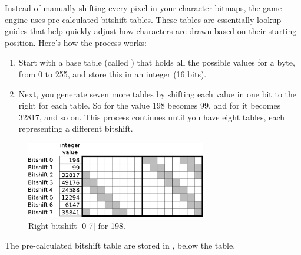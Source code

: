 \documentclass[book.tex]{subfiles}
\begin{document}
\par
Instead of manually shifting every pixel in your character bitmaps, the game engine uses pre-calculated bitshift tables. These tables are essentially lookup guides that help quickly adjust how characters are drawn based on their starting position. Here's how the process works:
\begin{enumerate}
  \item Start with a base table (called ) that holds all the possible values for a byte, from 0 to 255, and store this in an integer (16 bits). 
  \item Next, you generate seven more tables by shifting each value in  one bit to the right for each table. So for  the value 198 becomes 99, and for  it becomes 32817, and so on. This process continues until you have eight tables, each representing a different bitshift.
\end{enumerate}

\begin{figure}[H]
\centering
 \includegraphics[width=0.7\textwidth]{imgs/drawings/shift_tables.eps}
 \caption{Right bitshift [0-7] for 198.}
 \label{fig:shiftttable}
 \end{figure}

\par
The pre-calculated bitshift table are stored in , below the  table.\\

\begin{minipage}{\textwidth}
  
\end{minipage}
\label{wallclip_array}
\end{document}
